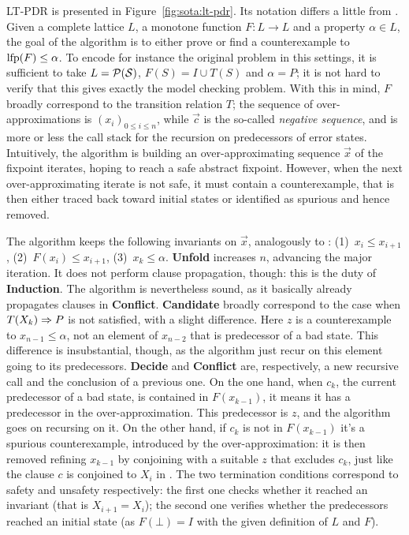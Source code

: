 LT-PDR is presented in Figure~\ref{fig:sota:lt-pdr}. Its notation differs a little from . Given a complete lattice $L$, a monotone function $F: L \rightarrow L$ and a property $\alpha \in L$, the goal of the algorithm is to either prove or find a counterexample to $\text{lfp}(F) \le \alpha$. To encode for instance the original  problem in this settings, it is sufficient to take $L = \mathcal{P}(\mathcal{S})$, $F(S) = I \cup T(S)$ and $\alpha = P$; it is not hard to verify that this gives exactly the model checking problem.
With this in mind, $F$ broadly correspond to the transition relation $T$; the sequence of over-approximations is $( x_i )_{0 \le i \le n}$, while $\vec{c}$ is the so-called \emph{negative sequence}, and is more or less the call stack for the recursion on predecessors of error states.
Intuitively, the algorithm is building an over-approximating sequence $\vec{x}$ of the fixpoint iterates, hoping to reach a safe abstract fixpoint. However, when the next over-approximating iterate is not safe, it must contain a counterexample, that is then either traced back toward initial states or identified as spurious and hence removed.

The algorithm keeps the following invariants on $\vec{x}$, analogously to : (1)~$x_i \le x_{i+1}$, (2)~$F(x_i) \le x_{i+1}$, (3)~$x_k \le \alpha$.
\textbf{Unfold} increases $n$, advancing the major iteration. It does not perform clause propagation, though: this is the duty of \textbf{Induction}. The algorithm is nevertheless sound, as it basically already propagates clauses in \textbf{Conflict}.
\textbf{Candidate} broadly correspond to the case when $T(X_k) \Rightarrow P$ is not satisfied, with a slight difference. Here $z$ is a counterexample to $x_{n-1} \le \alpha$, not an element of $x_{n-2}$ that is predecessor of a bad state. This difference is insubstantial, though, as the algorithm just recur on this element going to its predecessors.
\textbf{Decide} and \textbf{Conflict} are, respectively, a new recursive call and the conclusion of a previous one. On the one hand, when $c_k$, the current predecessor of a bad state, is contained in $F (x_{k-1})$, it means it has a predecessor in the over-approximation. This predecessor is $z$, and the algorithm goes on recursing on it. On the other hand, if $c_k$ is not in $F (x_{k-1})$ it's a spurious counterexample, introduced by the over-approximation: it is then removed refining $x_{k-1}$ by conjoining with a suitable $z$ that excludes $c_k$, just like the clause $c$ is conjoined to $X_i$ in .
The two termination conditions correspond to safety and unsafety respectively: the first one checks whether it reached an invariant (that is $X_{i+1} = X_i$); the second one verifies whether the predecessors reached an initial state (as $F(\bot) = I$ with the given definition of $L$ and $F$).

